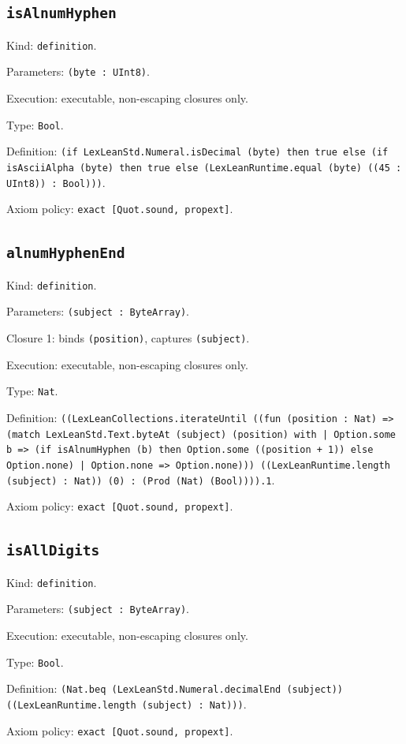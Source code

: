 \documentclass[11pt]{article}
\begin{document}
\subsection*{\texttt{isAlnumHyphen}}
\noindent Kind: \texttt{definition}.\par
\noindent Parameters: \texttt{(byte : UInt8)}.\par
\noindent Execution: executable, non-escaping closures only.\par
\noindent Type: \texttt{Bool}.\par
\noindent Definition: \texttt{(if LexLeanStd.Numeral.isDecimal (byte) then true else (if isAsciiAlpha (byte) then true else (LexLeanRuntime.equal (byte) ((45 : UInt8)) : Bool)))}.\par
\noindent Axiom policy: \texttt{exact [Quot.sound, propext]}.\par
\subsection*{\texttt{alnumHyphenEnd}}
\noindent Kind: \texttt{definition}.\par
\noindent Parameters: \texttt{(subject : ByteArray)}.\par
\noindent Closure 1: binds \texttt{(position)}, captures \texttt{(subject)}.\par
\noindent Execution: executable, non-escaping closures only.\par
\noindent Type: \texttt{Nat}.\par
\noindent Definition: \texttt{((LexLeanCollections.iterateUntil ((fun (position : Nat) => (match LexLeanStd.Text.byteAt (subject) (position) with | Option.some b => (if isAlnumHyphen (b) then Option.some ((position + 1)) else Option.none) | Option.none => Option.none))) ((LexLeanRuntime.length (subject) : Nat)) (0) : (Prod (Nat) (Bool)))).1}.\par
\noindent Axiom policy: \texttt{exact [Quot.sound, propext]}.\par
\subsection*{\texttt{isAllDigits}}
\noindent Kind: \texttt{definition}.\par
\noindent Parameters: \texttt{(subject : ByteArray)}.\par
\noindent Execution: executable, non-escaping closures only.\par
\noindent Type: \texttt{Bool}.\par
\noindent Definition: \texttt{(Nat.beq (LexLeanStd.Numeral.decimalEnd (subject)) ((LexLeanRuntime.length (subject) : Nat)))}.\par
\noindent Axiom policy: \texttt{exact [Quot.sound, propext]}.\par
\end{document}
